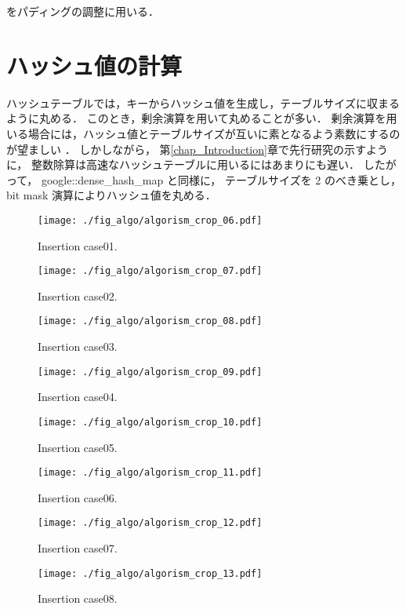 をパディングの調整に用いる．

\section{ハッシュ値の計算}

ハッシュテーブルでは，キーからハッシュ値を生成し，テーブルサイズに収まるように丸める．
このとき，剰余演算を用いて丸めることが多い．
剰余演算を用いる場合には，ハッシュ値とテーブルサイズが互いに素となるよう素数にするのが望ましい \citep{石畑1989}．
しかしながら，
第\ref{chap_Introduction}章で先行研究の示すように，
整数除算は高速なハッシュテーブルに用いるにはあまりにも遅い．
したがって，
google::dense\_hash\_map と同様に，
テーブルサイズを 2 のべき乗とし，
bit mask 演算によりハッシュ値を丸める．


\begin{figure}[h]
  \texttt{[image: ./fig\_algo/algorism\_crop\_06.pdf]}
  \caption{ Insertion case01. }
  \label{fig_IpCHashT_insert_hard_case01}

  \texttt{[image: ./fig\_algo/algorism\_crop\_07.pdf]}
  \caption{ Insertion case02. }
  \label{fig_IpCHashT_insert_hard_case02}

  \texttt{[image: ./fig\_algo/algorism\_crop\_08.pdf]}
  \caption{ Insertion case03. }
  \label{fig_IpCHashT_insert_hard_case03}

  \texttt{[image: ./fig\_algo/algorism\_crop\_09.pdf]}
  \caption{ Insertion case04. }
  \label{fig_IpCHashT_insert_hard_case04}
\end{figure}

\begin{figure}[h]
  \texttt{[image: ./fig\_algo/algorism\_crop\_10.pdf]}
  \caption{ Insertion case05. }
  \label{fig_IpCHashT_insert_hard_case05}

  \texttt{[image: ./fig\_algo/algorism\_crop\_11.pdf]}
  \caption{ Insertion case06. }
  \label{fig_IpCHashT_insert_hard_case06}

  \texttt{[image: ./fig\_algo/algorism\_crop\_12.pdf]}
  \caption{ Insertion case07. }
  \label{fig_IpCHashT_insert_hard_case07}

  \texttt{[image: ./fig\_algo/algorism\_crop\_13.pdf]}
  \caption{ Insertion case08. }
  \label{fig_IpCHashT_insert_hard_case08}
\end{figure}

